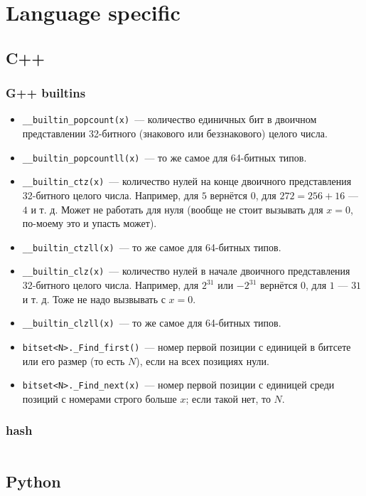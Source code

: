 \section{Language specific}

\subsection{C++}

\subsubsection{G++ builtins}

\begin{itemize}
	\item \texttt{__builtin_popcount(x)}~--- количество единичных бит в двоичном представлении 32-битного (знакового или беззнакового) целого числа.
	\item \texttt{__builtin_popcountll(x)}~--- то же самое для 64-битных типов.
	\item \texttt{__builtin_ctz(x)}~--- количество нулей на конце двоичного представления 32-битного целого числа. Например, для $5$ вернётся $0$, для $272 = 256 + 16$ --- $4$ и т. д. Может не работать для нуля (вообще не стоит вызывать для $x = 0$, по-моему это и упасть может).
	\item \texttt{__builtin_ctzll(x)}~--- то же самое для 64-битных типов.
	\item \texttt{__builtin_clz(x)}~--- количество нулей в начале двоичного представления 32-битного целого числа. Например, для $2^{31}$ или $-2^{31}$ вернётся
		$0$, для $1$ --- $31$ и т. д. Тоже не надо вызвывать с $x = 0$.
	\item \texttt{__builtin_clzll(x)}~--- то же самое для 64-битных типов.

	\item \texttt{bitset<N>._Find_first()}~--- номер первой позиции с единицей в битсете или его размер
		(то есть $N$), если на всех позициях нули.
	\item \texttt{bitset<N>._Find_next(x)}~--- номер первой позиции с единицей среди позиций с номерами строго больше $x$; если такой нет, то $N$.
\end{itemize}

\subsubsection{hash}

\inputminted{cpp}{code/hacks.cpp}

\subsection{Python}

\inputminted{py3}{code/python.py}
